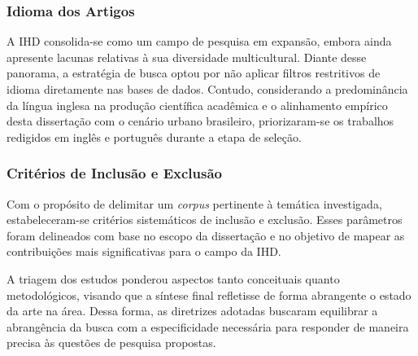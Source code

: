 \documentclass[
	12pt,				%
	oneside,			%
	a4paper,			%
	english,			%
	brazil				%
	]{abntex2ppgsi}
\begin{document}

   \subsubsection{Idioma dos Artigos}

    A IHD consolida-se como um campo de pesquisa em expansão, embora ainda apresente lacunas relativas à sua diversidade multicultural. Diante desse panorama, a estratégia de busca optou por não aplicar filtros restritivos de idioma diretamente nas bases de dados. Contudo, considerando a predominância da língua inglesa na produção científica acadêmica e o alinhamento empírico desta dissertação com o cenário urbano brasileiro, priorizaram-se os trabalhos redigidos em inglês e português durante a etapa de seleção.

    \subsubsection{Critérios de Inclusão e Exclusão}

    Com o propósito de delimitar um \textit{corpus} pertinente à temática investigada, estabeleceram-se critérios sistemáticos de inclusão e exclusão. Esses parâmetros foram delineados com base no escopo da dissertação e no objetivo de mapear as contribuições mais significativas para o campo da IHD.

    A triagem dos estudos ponderou aspectos tanto conceituais quanto metodológicos, visando que a síntese final refletisse de forma abrangente o estado da arte na área. Dessa forma, as diretrizes adotadas buscaram equilibrar a abrangência da busca com a especificidade necessária para responder de maneira precisa às questões de pesquisa propostas.
\end{document}
